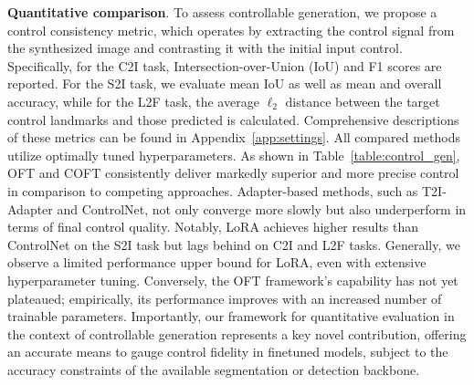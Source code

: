 \textbf{Quantitative comparison}. To assess controllable generation, we propose a control consistency metric, which operates by extracting the control signal from the synthesized image and contrasting it with the initial input control. Specifically, for the C2I task, Intersection-over-Union (IoU) and F1 scores are reported. For the S2I task, we evaluate mean IoU as well as mean and overall accuracy, while for the L2F task, the average $\ell_2$ distance between the target control landmarks and those predicted is calculated. Comprehensive descriptions of these metrics can be found in Appendix~\ref{app:settings}. All compared methods utilize optimally tuned hyperparameters. As shown in Table~\ref{table:control_gen}, OFT and COFT consistently deliver markedly superior and more precise control in comparison to competing approaches. Adapter-based methods, such as T2I-Adapter and ControlNet, not only converge more slowly but also underperform in terms of final control quality. Notably, LoRA achieves higher results than ControlNet on the S2I task but lags behind on C2I and L2F tasks. Generally, we observe a limited performance upper bound for LoRA, even with extensive hyperparameter tuning. Conversely, the OFT framework’s capability has not yet plateaued; empirically, its performance improves with an increased number of trainable parameters. Importantly, our framework for quantitative evaluation in the context of controllable generation represents a key novel contribution, offering an accurate means to gauge control fidelity in finetuned models, subject to the accuracy constraints of the available segmentation or detection backbone.

